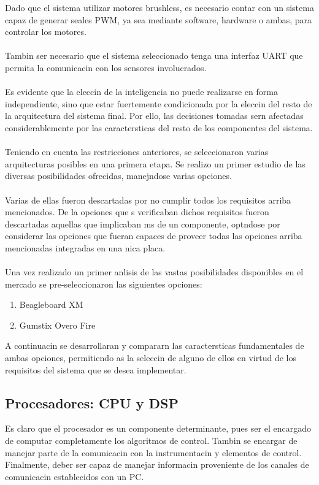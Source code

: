 \documentclass[spanish,12pt,a4paper,titlepage]{report}
\begin{document}
Dado que el sistema utilizar motores brushless, es necesario contar con un sistema capaz de generar seales PWM, ya sea mediante software, hardware o ambas, para controlar los motores.\\
\\
Tambin ser necesario que el sistema seleccionado tenga una interfaz UART que permita la comunicacin con los sensores involucrados.\\
\\
Es evidente que la eleccin de la inteligencia no puede realizarse en forma independiente, sino que estar fuertemente condicionada por la eleccin del resto de la arquitectura del sistema final. Por ello, las decisiones tomadas sern afectadas considerablemente por las caractersticas del resto de los componentes del sistema.\\
\\
Teniendo en cuenta las restricciones anteriores, se seleccionaron varias arquitecturas posibles en una primera etapa. Se realizo un primer estudio de las diversas posibilidades ofrecidas, manejndose varias opciones.\\
\\
Varias de ellas fueron descartadas por no cumplir todos los requisitos arriba mencionados. De la opciones que s verificaban dichos requisitos fueron descartadas aquellas que implicaban ms de un componente, optndose por considerar las opciones que fueran capaces de proveer todas las opciones arriba mencionadas integradas en una nica placa.\\
\\
Una vez realizado un primer anlisis de las vastas posibilidades disponibles en el mercado se pre-seleccionaron las siguientes opciones:

\begin{enumerate}
\item Beagleboard XM

\item Gumstix Overo Fire
\end{enumerate}
A continuacin se desarrollaran y compararn las caractersticas fundamentales de ambas opciones, permitiendo as la seleccin de alguno de ellos en virtud de los requisitos del sistema que se desea implementar. 

\subsection*{Procesadores: CPU y DSP}
Es claro que el procesador es un componente determinante, pues ser el encargado de computar completamente los algoritmos de control. Tambin se encargar de manejar parte de la comunicacin con la instrumentacin y elementos de control. Finalmente, deber ser capaz de manejar informacin proveniente de los canales de comunicacin establecidos con un PC.
\end{document}

